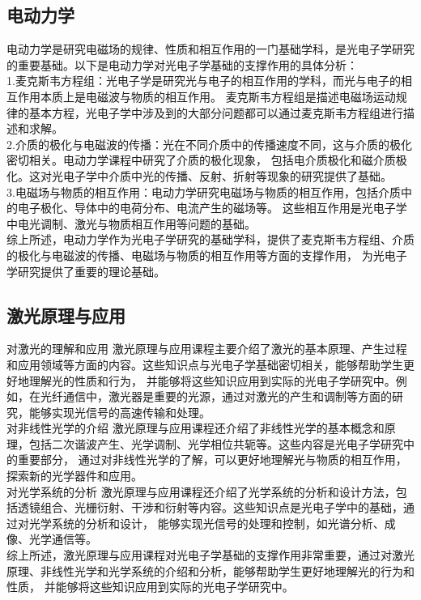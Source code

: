 \documentclass[12pt, a4paper, oneside]{article}
\begin{document}
\begin{spacing}{2.0}
\subsection{电动力学}
电动力学是研究电磁场的规律、性质和相互作用的一门基础学科，是光电子学研究的重要基础。以下是电动力学对光电子学基础的支撑作用的具体分析：
\\
1.麦克斯韦方程组：光电子学是研究光与电子的相互作用的学科，而光与电子的相互作用本质上是电磁波与物质的相互作用。
麦克斯韦方程组是描述电磁场运动规律的基本方程，光电子学中涉及到的大部分问题都可以通过麦克斯韦方程组进行描述和求解。
\\
2.介质的极化与电磁波的传播：光在不同介质中的传播速度不同，这与介质的极化密切相关。电动力学课程中研究了介质的极化现象，
包括电介质极化和磁介质极化。这对光电子学中介质中光的传播、反射、折射等现象的研究提供了基础。
\\
3.电磁场与物质的相互作用：电动力学研究电磁场与物质的相互作用，包括介质中的电子极化、导体中的电荷分布、电流产生的磁场等。
这些相互作用是光电子学中电光调制、激光与物质相互作用等问题的基础。
\\
综上所述，电动力学作为光电子学研究的基础学科，提供了麦克斯韦方程组、介质的极化与电磁波的传播、电磁场与物质的相互作用等方面的支撑作用，
为光电子学研究提供了重要的理论基础。
\subsection{激光原理与应用}

对激光的理解和应用
激光原理与应用课程主要介绍了激光的基本原理、产生过程和应用领域等方面的内容。这些知识点与光电子学基础密切相关，能够帮助学生更好地理解光的性质和行为，
并能够将这些知识应用到实际的光电子学研究中。例如，在光纤通信中，激光器是重要的光源，通过对激光的产生和调制等方面的研究，能够实现光信号的高速传输和处理。
\\
对非线性光学的介绍
激光原理与应用课程还介绍了非线性光学的基本概念和原理，包括二次谐波产生、光学调制、光学相位共轭等。这些内容是光电子学研究中的重要部分，
通过对非线性光学的了解，可以更好地理解光与物质的相互作用，探索新的光学器件和应用。
\\
对光学系统的分析
激光原理与应用课程还介绍了光学系统的分析和设计方法，包括透镜组合、光栅衍射、干涉和衍射等内容。这些知识点是光电子学中的基础，通过对光学系统的分析和设计，
能够实现光信号的处理和控制，如光谱分析、成像、光学通信等。
\\
综上所述，激光原理与应用课程对光电子学基础的支撑作用非常重要，通过对激光原理、非线性光学和光学系统的介绍和分析，能够帮助学生更好地理解光的行为和性质，
并能够将这些知识应用到实际的光电子学研究中。

\end{spacing}
\end{document}
